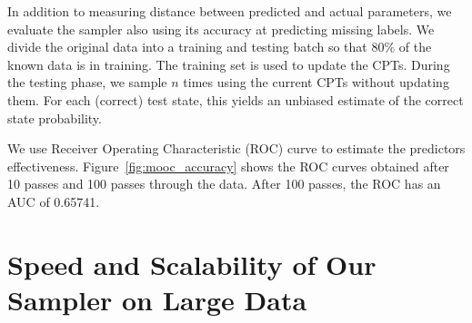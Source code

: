 \documentclass{article} %
\begin{document}
In addition to measuring distance between predicted and actual parameters, we evaluate
the sampler also using its accuracy at predicting missing labels.  We divide the original
data into a training and testing batch so that 80\% of the known data is in training. The training
set is used to update the CPTs. During the testing phase, we sample $n$ times using the current CPTs
without updating them. For each (correct) test state, this yields an unbiased estimate of the correct state
probability. 

We use Receiver Operating Characteristic (ROC) curve to estimate the predictors effectiveness.
Figure~\ref{fig:mooc_accuracy} shows the ROC curves obtained after 10 passes and 100 passes through the data. 
After 100 passes, the ROC has an AUC of 0.65741. 



\section{Speed and Scalability of Our Sampler on Large Data}\label{sec:scaling_large_data}
\end{document}
